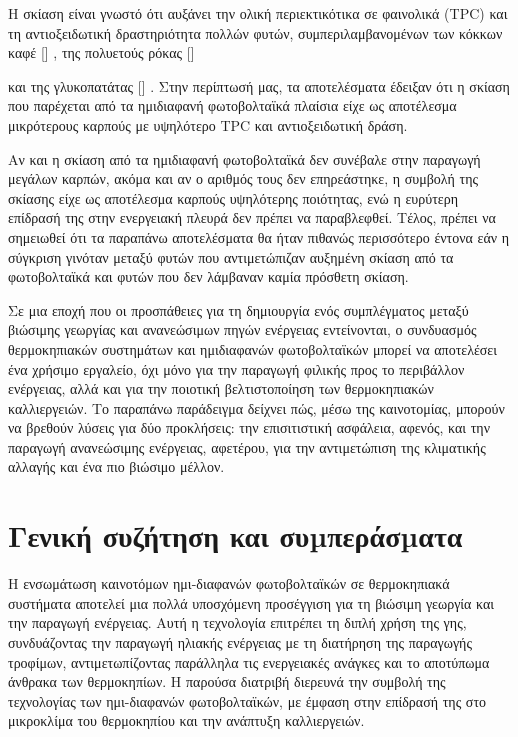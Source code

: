 \documentclass[12pt, a4paper]{report} %
\DeclareRobustCommand{\lcitep}[1]{%
  \english{[\cite{#1}]}%
}
\newcommand{\english}{\foreignlanguage{english}}
\begin{document}
Η σκίαση είναι γνωστό ότι αυξάνει την ολική περιεκτικότικα σε φαινολικά (\english{TPC}) και τη αντιοξειδωτική δραστηριότητα 
πολλών φυτών, συμπεριλαμβανομένων των κόκκων καφέ \lcitep{strawberries_bib27}, της πολυετούς ρόκας \lcitep{strawberries_bib28} 
και της γλυκοπατάτας \lcitep{strawberries_bib29}. Στην περίπτωσή μας, τα αποτελέσματα έδειξαν ότι η σκίαση που παρέχεται 
από τα ημιδιαφανή φωτοβολταϊκά πλαίσια είχε ως αποτέλεσμα μικρότερους καρπούς με υψηλότερο \english{TPC} και αντιοξειδωτική 
δράση.

Αν και η σκίαση από τα ημιδιαφανή φωτοβολταϊκά δεν συνέβαλε στην παραγωγή μεγάλων καρπών, ακόμα και αν ο αριθμός τους δεν 
επηρεάστηκε, η συμβολή της σκίασης είχε ως αποτέλεσμα καρπούς υψηλότερης ποιότητας, ενώ η ευρύτερη επίδρασή της στην 
ενεργειακή πλευρά δεν πρέπει να παραβλεφθεί. Τέλος, πρέπει να σημειωθεί ότι τα παραπάνω αποτελέσματα θα ήταν πιθανώς 
περισσότερο έντονα εάν η σύγκριση γινόταν μεταξύ φυτών που αντιμετώπιζαν αυξημένη σκίαση από τα φωτοβολταϊκά και φυτών που 
δεν λάμβαναν καμία πρόσθετη σκίαση.

Σε μια εποχή που οι προσπάθειες για τη δημιουργία ενός συμπλέγματος μεταξύ βιώσιμης γεωργίας και ανανεώσιμων πηγών ενέργειας 
εντείνονται, ο συνδυασμός θερμοκηπιακών συστημάτων και ημιδιαφανών φωτοβολταϊκών μπορεί να αποτελέσει ένα χρήσιμο εργαλείο, 
όχι μόνο για την παραγωγή φιλικής προς το περιβάλλον ενέργειας, αλλά και για την ποιοτική βελτιστοποίηση των θερμοκηπιακών 
καλλιεργειών. Το παραπάνω παράδειγμα δείχνει πώς, μέσω της καινοτομίας, μπορούν να βρεθούν λύσεις για δύο προκλήσεις: την 
επισιτιστική ασφάλεια, αφενός, και την παραγωγή ανανεώσιμης ενέργειας, αφετέρου, για την αντιμετώπιση της κλιματικής αλλαγής 
και ένα πιο βιώσιμο μέλλον.

\newpage
\vspace*{6.5cm}
\section{Γενική συζήτηση και συµπεράσµατα}\label{general_discussion}
Η ενσωμάτωση καινοτόμων ημι-διαφανών φωτοβολταϊκών σε θερμοκηπιακά συστήματα αποτελεί μια πολλά υποσχόμενη προσέγγιση για τη 
βιώσιμη γεωργία και την παραγωγή ενέργειας. Αυτή η τεχνολογία επιτρέπει τη διπλή χρήση της γης, συνδυάζοντας την παραγωγή 
ηλιακής ενέργειας με τη διατήρηση της παραγωγής τροφίμων, αντιμετωπίζοντας παράλληλα τις ενεργειακές ανάγκες και το αποτύπωμα 
άνθρακα των θερμοκηπίων. Η παρούσα διατριβή διερευνά την συμβολή της τεχνολογίας των ημι-διαφανών φωτοβολταϊκών, με έμφαση 
στην επίδρασή της στο μικροκλίμα του θερμοκηπίου και την ανάπτυξη καλλιεργειών.
\end{document}

